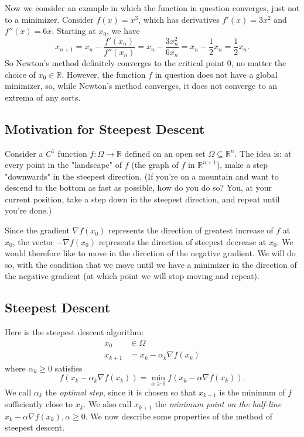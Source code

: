 \documentclass[11pt]{book}
\newcommand{\R}{\mathbb{R}}
\begin{document}
Now we consider an example in which the function in question converges, just not to a minimizer. Consider $f(x) = x^3$, which has derivatives $f'(x) = 3x^2$ and $f''(x) = 6x$. Starting at $x_0$, we have
\[
x_{n+1} = x_n - \frac{f'(x_n)}{f''(x_n)} = x_n - \frac{3x_n^2}{6x_n} = x_n - \frac{1}{2}x_n = \frac{1}{2}x_n.
\]
So Newton's method definitely converges to the critical point $0$, no matter the choice of $x_0 \in \R$. However, the function $f$ in question does not have a global minimizer, so, while Newton's method converges, it does not converge to an extrema of any sorts.

\subsection{Motivation for Steepest Descent}

Consider a $C^1$ function $f : \Omega \to \R$ defined on an open set $\Omega \subseteq \R^n$. The idea is: at every point in the "landscape" of $f$ (the graph of $f$ in $\R^{n+1}$), make a step "downwards" in the steepest direction. (If you're on a mountain and want to descend to the bottom as fast as possible, how do you do so? You, at your current position, take a step down in the steepest direction, and repeat until you're done.) 

Since the gradient $\nabla f(x_0)$ represents the direction of greatest increase of $f$ at $x_0$, the vector $-\nabla f(x_0)$ represents the direction of steepest decrease at $x_0$. We would therefore like to move in the direction of the negative gradient. We will do so, with the condition that we move until we have a minimizer in the direction of the negative gradient (at which point we will stop moving and repeat).

\subsection{Steepest Descent}

Here is the steepest descent algorithm:
\begin{align*}
x_0 &\in \Omega \\
x_{k+1} &= x_k - \alpha_k \nabla f(x_k)
\end{align*}
where $\alpha_k \geq 0$ satisfies 
\[
f(x_k - \alpha_k \nabla f(x_k)) = \min_{\alpha \geq 0} f(x_k - \alpha \nabla f(x_k)).
\]
We call $\alpha_k$ the \emph{optimal step}, since it is chosen so that $x_{k+1}$ is the minimum of $f$ sufficiently close to $x_k$. We also call $x_{k+1}$ the \emph{minimum point on the half-line} $x_k - \alpha \nabla f(x_k), \alpha \geq 0$. We now describe some properties of the method of steepest descent.
\end{document}

